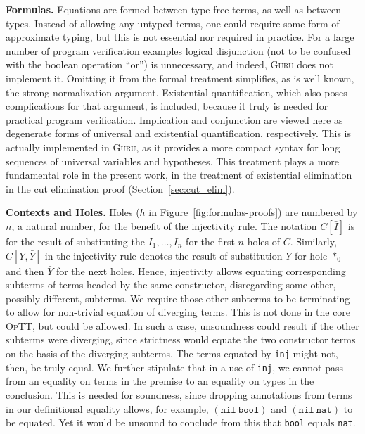\documentclass{fundam}
\newcommand{\optt}{\textsc{OpTT}}
\begin{document}
\textbf{Formulas.} Equations are formed between type-free terms, as
well as between types.  Instead of allowing any untyped terms, one
could require some form of approximate typing, but this is not
essential nor required in practice.  For a large number of program
verification examples logical disjunction (not to be confused with the
boolean operation ``or'') is unnecessary, and indeed, \textsc{Guru}
does not implement it.  Omitting it from the formal treatment
simplifies, as is well known, the strong normalization argument.
Existential quantification, which also poses complications for that
argument, is included, because it truly is needed for practical
program verification.  Implication and conjunction are viewed here as
degenerate forms of universal and existential quantification,
respectively.  This is actually implemented in \textsc{Guru}, as it
provides a more compact syntax for long sequences of universal
variables and hypotheses.  This treatment plays a more fundamental
role in the present work, in the treatment of existential elimination
in the cut elimination proof (Section~\ref{sec:cut_elim}).

\textbf{Contexts and Holes.}  Holes ($h$ in
Figure~\ref{fig:formulas-proofs}) are numbered by $n$, a natural
number, for the benefit of the injectivity rule.  The notation
$C[\bar{I}]$ is for the result of substituting the $I_1,\ldots,I_n$
for the first $n$ holes of $C$.  Similarly, $C[Y,\bar{Y}]$ in the
injectivity rule denotes the result of substitution $Y$ for hole $*_0$
and then $\bar{Y}$ for the next holes.  Hence, injectivity allows
equating corresponding subterms of terms headed by the same
constructor, disregarding some other, possibly different, subterms.
We require those other subterms to be terminating to allow for
non-trivial equation of diverging terms.  This is not done in the core
\optt, but could be allowed.  In such a case, unsoundness could result
if the other subterms were diverging, since strictness would equate
the two constructor terms on the basis of the diverging subterms.  The
terms equated by \texttt{inj} might not, then, be truly equal.  We
further stipulate that in a use of \texttt{inj}, we cannot pass from
an equality on terms in the premise to an equality on types in the
conclusion.  This is needed for soundness, since dropping annotations
from terms in our definitional equality allows, for example,
$(\texttt{nil}\ \texttt{bool})$ and $(\texttt{nil}\ \texttt{nat})$ to
be equated.  Yet it would be unsound to conclude from this that
\texttt{bool} equals \texttt{nat}.
\end{document}
